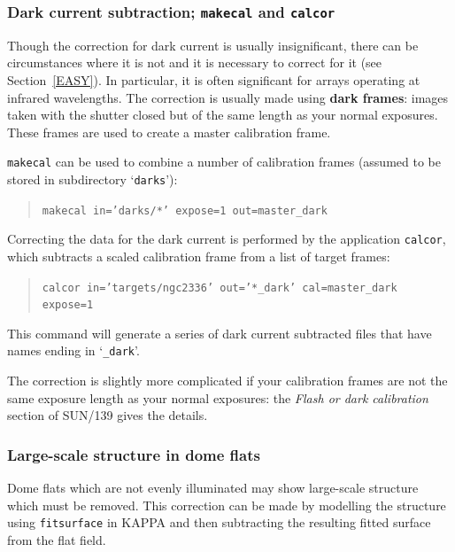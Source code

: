 \documentclass[twoside,11pt]{article}
\newcommand{\xref}[3]{#1}
\begin{document}
\subsubsection{Dark current subtraction; {\tt makecal} and {\tt calcor}}

Though the correction for dark current is usually insignificant, there
can be circumstances where it is not and it is necessary to correct for
it (see Section~\ref{EASY}).  In particular, it is often significant
for arrays operating at infrared wavelengths.  The correction is usually
made using {\bf dark frames}: images taken with the shutter closed but of
the same length as your normal exposures.  These frames are used to create
a master calibration frame.

{\tt makecal} can be used to combine a number of calibration frames
(assumed to be stored in subdirectory `{\tt darks}'):

\begin{quote}
{\tt makecal in='darks/*' expose=1 out=master\_dark}
\end{quote}

Correcting the data for the dark current is performed by the application
{\tt calcor}, which subtracts a scaled calibration frame from a list of
target frames:

\begin{quote}
{\tt calcor in='targets/ngc2336' out='*\_dark' cal=master\_dark
expose=1}
\end{quote}

This command will generate a series of dark current subtracted files that
have names ending in `{\tt \_dark}'.

The correction is slightly more complicated if your calibration frames
are not the same exposure length as your normal exposures: the
\xref{{\it Flash or dark calibration}}{sun139}{flashordark}\/ section
of \xref{SUN/139}{sun139}{}\/\cite{SUN139} gives the details.

\subsubsection{Large-scale structure in dome flats}

Dome flats which are not evenly illuminated may show large-scale structure
which must be removed.  This correction can be made by modelling the
structure using \xref{{\tt fitsurface}}{sun95}{FITSURFACE} in KAPPA
and then subtracting the resulting fitted surface from the flat field.


\newpage
\end{document}

